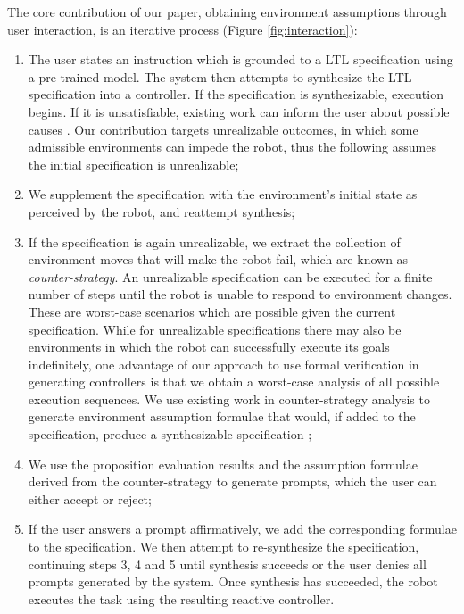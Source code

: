 \documentclass[letterpaper]{article} %
\begin{document}
The core contribution of our paper, obtaining environment assumptions through user interaction, is an iterative process (Figure \ref{fig:interaction}):

\begin{enumerate}
\item The user states an instruction which is grounded to a LTL specification using a pre-trained model. The system then attempts to synthesize the LTL specification into a controller. If the specification is synthesizable, execution begins. If it is unsatisfiable, existing work can inform the user about possible causes \cite{raman2013sorry,boteanu2016model}. Our contribution targets unrealizable outcomes, in which some admissible environments can impede the robot, thus the following assumes the initial specification is unrealizable;

\item We supplement the specification with the environment's initial state as perceived by the robot, and reattempt synthesis;

\item If the specification is again unrealizable, we extract the collection of environment moves that will make the robot fail, which are known as \textit{counter-strategy}. An unrealizable specification can be executed for a finite number of steps until the robot is unable to respond to environment changes. These are worst-case scenarios which are possible given the current specification. While for unrealizable specifications there may also be environments in which the robot can successfully execute its goals indefinitely, one advantage of our approach to use formal verification in generating controllers is that we obtain a worst-case analysis of all possible execution sequences. We use existing work in counter-strategy analysis to generate environment assumption formulae that would, if added to the specification, produce a synthesizable specification \cite{alur2013counter};

\item We use the proposition evaluation results and the assumption formulae derived from the counter-strategy to generate prompts, which the user can either accept or reject;

\item If the user answers a prompt affirmatively, we add the corresponding formulae to the specification. We then attempt to re-synthesize the specification, continuing steps 3, 4 and 5 until synthesis succeeds or the user denies all prompts generated by the system. Once synthesis has succeeded, the robot executes the task using the resulting reactive controller.

\end{enumerate}
\end{document}
